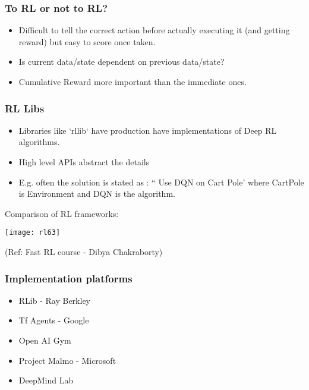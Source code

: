 \begin{frame}[fragile]\frametitle{To RL or not to RL?}

\begin{itemize}
\item Difficult to tell the correct action before actually executing it (and getting reward) but easy to score once taken.
\item Is current data/state dependent on previous data/state?
\item Cumulative Reward more important than the immediate ones.
\end{itemize}
\end{frame}



\begin{frame}[fragile]\frametitle{RL Libs}

\begin{itemize}
\item Libraries like `rllib` have production have implementations of Deep RL algorithms.
\item High level APIs abstract the details
\item E.g. often the solution is stated as : `` Use DQN on Cart Pole' where CartPole is Environment and DQN is the algorithm.
\end{itemize}

Comparison of RL frameworks:

\begin{center}
\texttt{[image: rl63]}

{\tiny (Ref: Fast RL course - Dibya Chakraborty)}
\end{center}

\end{frame}

\begin{frame}[fragile]\frametitle{Implementation platforms}

\begin{itemize}
\item RLib - Ray Berkley
\item Tf Agents - Google
\item Open AI Gym
\item Project Malmo - Microsoft
\item DeepMind Lab
\end{itemize}

\end{frame}

